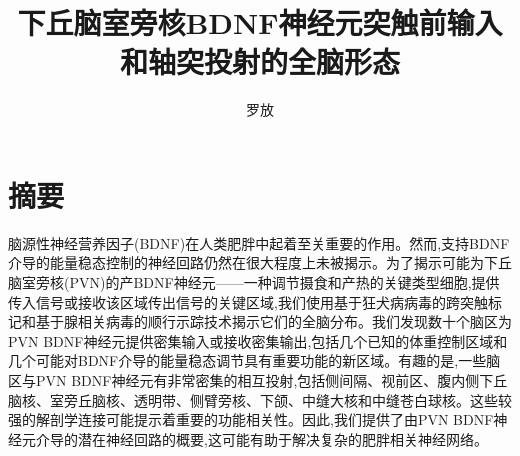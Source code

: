 \confidential{}%
\title{下丘脑室旁核BDNF神经元突触前输入和轴突投射的全脑形态}%
\author{罗\quad 放}%

\advisorsec{}%


\maketitle%
\makeenglishtitle%
\makedeclaration%
\chapter*{摘\quad 要}%
\setcounter{page}{1}%

脑源性神经营养因子(BDNF)在人类肥胖中起着至关重要的作用。然而,支持BDNF介导的能量稳态控制的神经回路仍然在很大程度上未被揭示。为了揭示可能为下丘脑室旁核(PVN)的产BDNF神经元------一种调节摄食和产热的关键类型细胞,提供传入信号或接收该区域传出信号的关键区域,我们使用基于狂犬病病毒的跨突触标记和基于腺相关病毒的顺行示踪技术揭示它们的全脑分布。我们发现数十个脑区为PVN BDNF神经元提供密集输入或接收密集输出,包括几个已知的体重控制区域和几个可能对BDNF介导的能量稳态调节具有重要功能的新区域。有趣的是,一些脑区与PVN BDNF神经元有非常密集的相互投射,包括侧间隔、视前区、腹内侧下丘脑核、室旁丘脑核、透明带、侧臂旁核、下颌、中缝大核和中缝苍白球核。这些较强的解剖学连接可能提示着重要的功能相关性。因此,我们提供了由PVN BDNF神经元介导的潜在神经回路的概要,这可能有助于解决复杂的肥胖相关神经网络。

